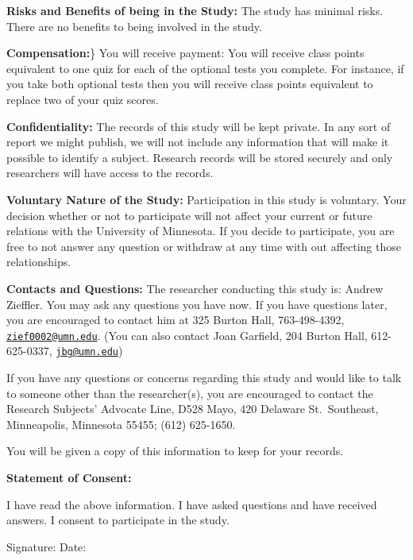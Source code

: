 \documentclass[11pt]{umnthesis}
\begin{document}
\noindent \textbf{Risks and Benefits of being in the Study:} The study has minimal risks. There are no benefits to being involved in the study.

\noindent \textbf{Compensation:}\} You will receive payment: You will receive class points equivalent to one quiz for each of the optional tests you complete. For instance, if you take both optional tests then you will receive class points equivalent to replace two of your quiz scores.

\noindent \textbf{Confidentiality:} The records of this study will be kept private. In any sort of report we might publish, we will not include any information that will make it possible to identify a subject. Research records will be stored securely and only researchers will have access to the records.

\noindent \textbf{Voluntary Nature of the Study:} Participation in this study is voluntary. Your decision whether or not to participate will not affect your current or future relations with the University of Minnesota. If you decide to participate, you are free to not answer any question or withdraw at any time with out affecting those relationships.

\noindent \textbf{Contacts and Questions:} The researcher conducting this study is: Andrew Zieffler. You may ask any questions you have now. If you have questions later, you are encouraged to contact him at 325 Burton Hall, 763-498-4392, \href{mailto:zief0002@umn.edu}{\nolinkurl{zief0002@umn.edu}}. (You can also contact Joan Garfield, 204 Burton Hall, 612-625-0337, \href{mailto:jbg@umn.edu}{\nolinkurl{jbg@umn.edu}})

\noindent If you have any questions or concerns regarding this study and would like to talk to someone other than the researcher(s), you are encouraged to contact the Research Subjects' Advocate Line, D528 Mayo, 420 Delaware St.~Southeast, Minneapolis, Minnesota 55455; (612) 625-1650.

\noindent You will be given a copy of this information to keep for your records.

\noindent \textbf{Statement of Consent:}

\noindent I have read the above information. I have asked questions and have received answers. I consent to participate in the study.

\noindent Signature: \underline{\hspace{3in}} Date: \underline{\hspace{1in}}
\end{document}
